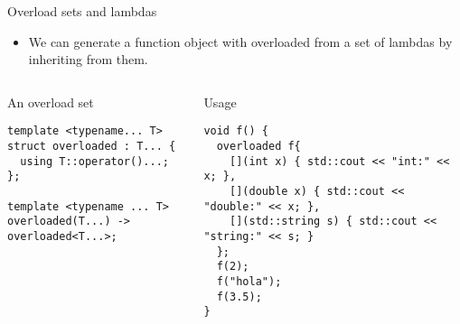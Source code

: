 \begin{frame}[t,fragile]{Overload sets and lambdas}
\begin{itemize}
  \item We can generate a function object with overloaded 
        from a set of lambdas by inheriting from them.
\end{itemize}

\begin{columns}[T]

\begin{block}{An overload set}
\begin{lstlisting}
template <typename... T>
struct overloaded : T... {
  using T::operator()...;
};

template <typename ... T>
overloaded(T...) -> overloaded<T...>;
\end{lstlisting}
\end{block}

\pause
{}
\begin{block}{Usage}
\begin{lstlisting}
void f() {
  overloaded f{
    [](int x) { std::cout << "int:" << x; },
    [](double x) { std::cout << "double:" << x; },
    [](std::string s) { std::cout << "string:" << s; }
  };
  f(2);
  f("hola");
  f(3.5);
}

\end{lstlisting}
\end{block}

\end{columns}
\end{frame}

